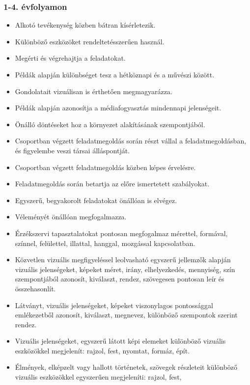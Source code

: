 \hypertarget{evfolyamon-38}{%
\subsubsection{1-4. évfolyamon}\label{evfolyamon-38}}

\begin{itemize}
\item
  Alkotó tevékenység közben bátran kísérletezik.
\item
  Különböző eszközöket rendeltetésszerűen használ.
\item
  Megérti és végrehajtja a feladatokat.
\item
  Példák alapján különbséget tesz a hétköznapi és a művészi között.
\item
  Gondolatait vizuálisan is érthetően megmagyarázza.
\item
  Példák alapján azonosítja a médiafogyasztás mindennapi jelenségeit.
\item
  Önálló döntéseket hoz a környezet alakításának szempontjából.
\item
  Csoportban végzett feladatmegoldás során részt vállal a
  feladatmegoldásban, és figyelembe veszi társai álláspontját.
\item
  Csoportban végzett feladatmegoldás közben képes érvelésre.
\item
  Feladatmegoldás során betartja az előre ismertetett szabályokat.
\item
  Egyszerű, begyakorolt feladatokat önállóan is elvégez.
\item
  Véleményét önállóan megfogalmazza.
\item
  Érzékszervi tapasztalatokat pontosan megfogalmaz mérettel, formával,
  színnel, felülettel, illattal, hanggal, mozgással kapcsolatban.
\item
  Közvetlen vizuális megfigyeléssel leolvasható egyszerű jellemzők
  alapján vizuális jelenségeket, képeket méret, irány, elhelyezkedés,
  mennyiség, szín szempontjából azonosít, kiválaszt, rendez, szövegesen
  pontosan leír és összehasonlít.
\item
  Látványt, vizuális jelenségeket, képeket viszonylagos pontossággal
  emlékezetből azonosít, kiválaszt, megnevez, különböző szempontok
  szerint rendez.
\item
  Vizuális jelenségeket, egyszerű látott képi elemeket különböző
  vizuális eszközökkel megjelenít: rajzol, fest, nyomtat, formáz, épít.
\item
  Élmények, elképzelt vagy hallott történetek, szövegek részleteit
  különböző vizuális eszközökkel egyszerűen megjeleníti: rajzol, fest,

\end{itemize}
